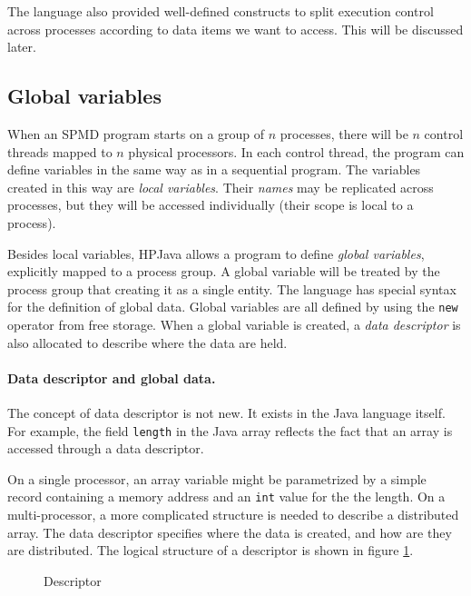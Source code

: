 The language also provided well-defined constructs to split
execution control across processes according to data items we want to
access.  This will be discussed later.

\subsection{Global variables}

When an SPMD program starts on a group of $n$ processes, there will be
$n$ control threads mapped to $n$ physical processors.
In each control thread, the program can define variables in the same
way as in a sequential program.  The variables created in this way are
\emph{local variables}.  Their {\em names} may be replicated across
processes, but they will be accessed individually (their scope is
local to a process).

Besides local variables, HPJava allows a program to define \emph{global
variables}, explicitly mapped to a process group.  A global variable
will be treated by the process group that creating it as a single
entity.
The language has special syntax for the definition of global data.
Global variables are all defined by using the \texttt{new}
operator from free storage.  When a global variable is created, a
\emph{data descriptor} is also allocated to describe where the data are
held.


\paragraph{Data descriptor and global data.}

The concept of data descriptor is not new. It exists in the Java
language itself.  For example, the field \texttt{length} in the Java
array reflects the fact that an array is accessed through a data
descriptor.

On a single processor, an array variable might be parametrized by a
simple record containing a memory address and an \texttt{int} value
for the the length.  On a multi-processor, a more complicated structure
is needed to describe a distributed array.  The data descriptor specifies
where the data is created, and how are they are distributed.  The
logical structure of a descriptor is shown in figure
\ref{fig:descriptor}.

\begin{figure}[htbp]
  \begin{center}
    \leavevmode
    \caption{Descriptor}
    \label{fig:descriptor}
  \end{center}
\end{figure}

